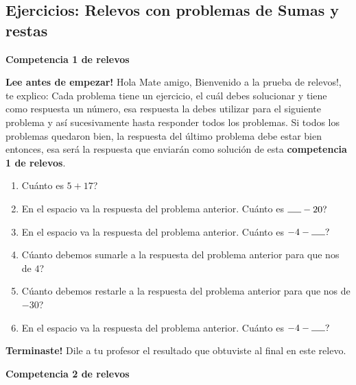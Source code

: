 \newpage

\begin{center}
	\vspace{-1cm}
	\subsection{ Ejercicios: Relevos con problemas de Sumas y restas }\label{ejercicios:subsubsection:restaNumerosReales:relevos1}
\end{center}

\begin{center}
\textbf{Competencia  1 de relevos}
\end{center}
\textbf{Lee antes de empezar! } Hola Mate amigo, Bienvenido a la prueba de relevos!, te explico: Cada problema tiene un ejercicio, el cuál debes solucionar y tiene como respuesta un número, esa respuesta la debes utilizar para el siguiente problema y así sucesivamente hasta responder todos los problemas. Si todos los problemas quedaron bien, la respuesta del último problema debe estar bien entonces, esa será la respuesta que enviarán como solución de esta \textbf{competencia 1 de relevos}.
\vspace{1cm}
\begin{enumerate}
	\item Cuánto es $5+17$?
	
	\item En el espacio va la respuesta del problema anterior. Cuánto es $\rule{5mm}{0.15mm} - 20?$
	
	\item En el espacio va la respuesta del problema anterior. Cuánto es $-4-\rule{5mm}{0.15mm} ?$
	
	\item Cúanto debemos sumarle a la respuesta del problema anterior para que nos de $4$?
	
	\item Cúanto debemos restarle a la respuesta del problema anterior para que nos de $-30$?
	
	\item En el espacio va la respuesta del problema anterior. Cuánto es $-4-\rule{5mm}{0.15mm} ?$
\end{enumerate}

\textbf{Terminaste! } Dile a tu profesor el resultado que obtuviste al final en este relevo.
\newpage

\begin{center}
	\textbf{Competencia  2 de relevos}
\end{center}
	
